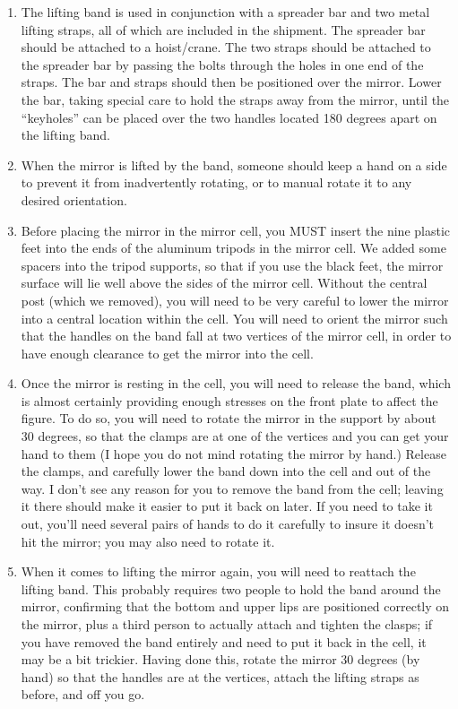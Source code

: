 \documentclass{letter}
\begin{document}
\begin{letter}
\begin{enumerate}
  \item The lifting band is used in conjunction with a spreader bar and two
   metal lifting straps, all of which are included in the shipment. The
   spreader bar should be attached to a hoist/crane. The two straps should
   be attached to the spreader bar by passing the bolts through the holes
   in one end of the straps. The bar and straps should then be positioned 
   over the mirror. Lower the bar, taking special care to hold the straps
   away from the mirror, until the ``keyholes'' can be placed over the
   two handles located 180 degrees apart on the lifting band. 

  \item When the mirror is lifted by the band, someone should keep a hand on
   a side to prevent it from inadvertently rotating, or to manual rotate
   it to any desired orientation.

  \item Before placing the mirror in the mirror cell, you MUST insert the
   nine plastic feet into the ends of the aluminum tripods in the mirror
   cell. We added some spacers into the tripod supports, so that if you use the 
   black feet, the mirror surface will lie well above the sides of the
   mirror cell. Without the central post (which we removed), you will
   need to be very careful to lower the mirror into a central location
   within the cell. You will need to orient the mirror such that the
   handles on the band fall at two vertices of the mirror cell, in order
   to have enough clearance to get the mirror into the cell.

  \item Once the mirror is resting in the cell, you will need to release the
   band, which is almost certainly providing enough stresses on the front
   plate to affect the figure. To do so, you will need to rotate the mirror
   in the support by about 30 degrees, so that the clamps are at one of
   the vertices and you can get your hand to them (I hope you do not mind
   rotating the mirror by hand.)  Release the clamps, and carefully lower
   the band down into the cell and out of the way. I don't see any reason
   for you to remove the band from the cell; leaving it there should make it
   easier to put it back on later. If you need to take it out, you'll need
   several pairs of hands to do it carefully to insure it doesn't hit
   the mirror; you may also need to rotate it. 

  \item When it comes to lifting the mirror again, you will need to reattach
   the lifting band. This probably requires two people to hold the band
   around the mirror, confirming that the bottom and upper lips are positioned
   correctly on the mirror, plus a third person to actually attach and
   tighten the clasps; if you have removed the band entirely and need to
   put it back in the cell, it may be a bit trickier. 
   Having done this, rotate the mirror 30 degrees (by hand)
   so that the handles are at the vertices, attach the lifting straps
   as before, and off you go.
\end{enumerate}


\end{letter}
\end{document}
